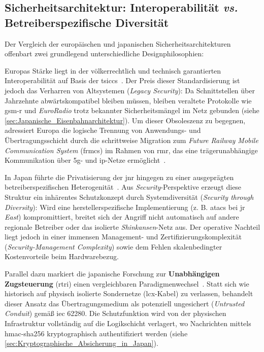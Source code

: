 \documentclass[runningheads]{res/llncs}
\begin{document}
\subsection{Sicherheitsarchitektur: Interoperabilität \textit{vs.} Betreiberspezifische Diversität}
\label{sec:Sicherheitsarchitektur_Interoperabilität_vs_Betreiberspezifische_Diversität}
Der Vergleich der europäischen und japanischen Sicherheitsarchitekturen offenbart zwei grundlegend unterschiedliche Designphilosophien:

Europas Stärke liegt in der völkerrechtlich und technisch garantierten Interoperabilität auf Basis der \gls{tsiccs}~\parencite[S. 49]{trinckaufETCS2024}. Der Preis dieser Standardisierung ist jedoch das Verharren von Altsystemen (\textit{Legacy Security}): Da Schnittstellen über Jahrzehnte abwärtskompatibel bleiben müssen, bleiben veraltete Protokolle wie \gls{gsm-r} und \textit{EuroRadio} trotz bekannter Sicherheitsmängel im Netz gebunden (siehe \autoref{sec:Japanische_Eisenbahnarchitektur}). Um dieser Obsoleszenz zu begegnen, adressiert Europa die logische Trennung von Anwendungs- und Übertragungsschicht durch die schrittweise Migration zum \textit{Future Railway Mobile Communication System} (\gls{frmcs}) im Rahmen von \gls{rmr}, das eine trägerunabhängige Kommunikation über \gls{5g}- und \gls{ip}-Netze ermöglicht~\parencite[S. 123, 211]{trinckaufETCS2024}.

In Japan führte die Privatisierung der \gls{jnr} hingegen zu einer ausgeprägten betreiberspezifischen Heterogenität~\parencite[S. 47--49]{yanaseJapanese2011}. Aus \textit{Security}-Perspektive erzeugt diese Struktur ein inhärentes Schutzkonzept durch Systemdiversität (\textit{Security through Diversity}): Wird eine herstellerspezifische Implementierung (z. B. \gls{atacs} bei \gls{jr} \textit{East}) kompromittiert, breitet sich der Angriff nicht automatisch auf andere regionale Betreiber oder das isolierte \textit{Shinkansen}-Netz aus. Der operative Nachteil liegt jedoch in einer immensen Management- und Zertifizierungskomplexität (\textit{Security-Management Complexity}) sowie dem Fehlen skalenbedingter Kostenvorteile beim Hardwarebezug.

Parallel dazu markiert die japanische Forschung zur \textbf{Unabhängigen Zugsteuerung} (\gls{rtri}) einen vergleichbaren Paradigmenwechsel~\parencite[S. 1--3]{iwamotoTrain2024}. Statt sich wie historisch auf physisch isolierte Sondernetze (\gls{lcx}-Kabel) zu verlassen, behandelt dieser Ansatz das Übertragungsmedium als potenziell ungesichert (\textit{Untrusted Conduit}) gemäß \gls{iec} 62280. Die Schutzfunktion wird von der physischen Infrastruktur vollständig auf die Logikschicht verlagert, wo Nachrichten mittels \gls{hmac-sha256} kryptographisch authentifiziert werden (siehe \autoref{sec:Kryptographische_Absicherung_in_Japan}).
\end{document}
